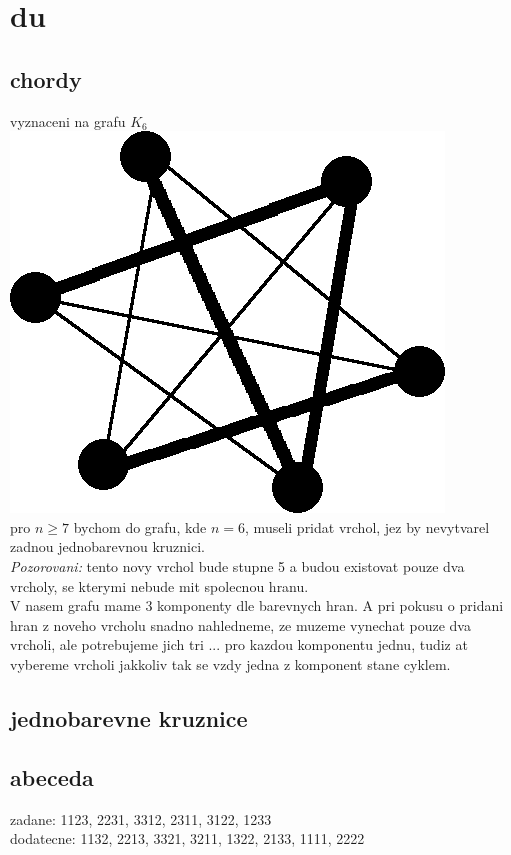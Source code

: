 \documentclass[a4paper]{article}
\begin{document}
\pagestyle{fancy}

\setcounter{section}{3}
\section{du}
\subsection{chordy}
vyznaceni na grafu $K_6$\\
\includegraphics[width=.3\textwidth]{chords.png}\\
pro $n\geq7$ bychom do grafu, kde $n=6$, museli pridat vrchol,
jez by nevytvarel zadnou jednobarevnou kruznici.\\
\textit{Pozorovani:} tento novy vrchol bude stupne 5
a budou existovat pouze dva vrcholy,
se kterymi nebude mit spolecnou hranu.\\
V nasem grafu mame 3 komponenty dle barevnych hran.
A pri pokusu o pridani hran z noveho vrcholu snadno nahledneme,
ze muzeme vynechat pouze dva vrcholi, ale potrebujeme jich tri ... 
pro kazdou komponentu jednu, tudiz at vybereme vrcholi jakkoliv tak
se vzdy jedna z komponent stane cyklem.


\subsection{jednobarevne kruznice}



\subsection{abeceda}
zadane:     1123, 2231, 3312, 2311, 3122, 1233\\
dodatecne:  1132, 2213, 3321, 3211, 1322, 2133, 1111, 2222
\end{document}
